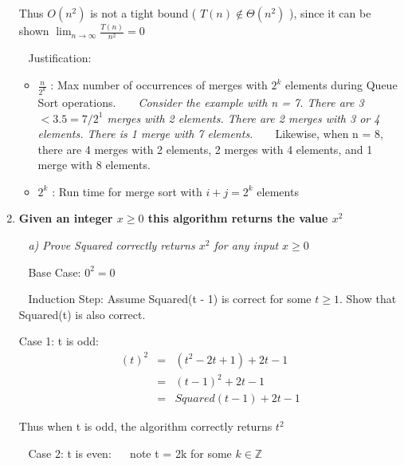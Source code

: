 \documentclass[12pt, letterpaper]{article}
\begin{document}
\begin{enumerate}
    \textnormal{Thus \(O(n^2)\) is not a tight bound ( \(T(n) \notin \Theta(n^2)\) ), since it can be shown \( \lim_{n \rightarrow \infty} \frac{T(n)}{n^2} = 0 \)}

    \-\ \newline
    Justification:
    \begin{itemize}
        \item \textnormal{\( \frac{n}{2^k}\) : Max number of occurrences of merges with \(2^{k}\) elements during Queue Sort operations.
        \-\ \newline
        \-\ \newline
        \emph{Consider the example with n = 7. There are 3 \(< 3.5 = 7 / 2^1\) merges with 2 elements. There are 2 merges with 3 or 4 elements. There is 1 merge with 7 elements. }}
        \-\ \newline
        \-\ \newline
        Likewise, when n = 8, there are 4 merges with 2 elements, 2 merges with 4 elements, and 1 merge with 8 elements. 

        \item \textnormal{\( 2^k\) : Run time for merge sort with \(i + j = 2^k\) elements}
    \end{itemize} 


    \newpage
    \item 
    \bf{ Given an integer \(x \ge 0\) this algorithm returns the value \(x^2\) }

    \-\ \newline
    \it{ a) Prove Squared correctly returns \(x^2\) for any input \(x \ge 0\) }

    \-\ \newline
    Base Case: \(0^2 = 0\)

    \-\ \newline
    Induction Step: \textnormal{ Assume Squared(t - 1) is correct for some \(t \ge 1\). Show that Squared(t) is also correct. }

    Case 1: t is odd:
    \begin{eqnarray}
        (t)^2 &=& (t^2 -2t + 1) + 2t - 1 \\
        &=& (t - 1)^2 + 2t - 1 \\
        &=& Squared(t - 1) + 2t - 1
    \end{eqnarray}

    Thus when t is odd, the algorithm correctly returns \(t^2\)

    \-\ \newline
    Case 2: t is even:
    \-\ \newline
    \-\ note t = 2k for some \(k \in \mathbb{Z}\)


\end{enumerate}
\end{document}
